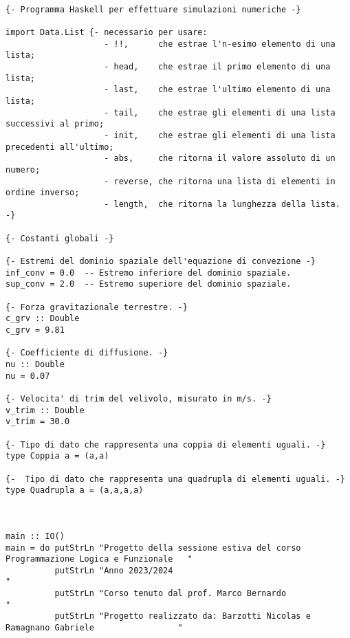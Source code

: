 
\scriptsize
\begin{verbatim}
   
{- Programma Haskell per effettuare simulazioni numeriche -}

import Data.List {- necessario per usare: 
                    - !!,      che estrae l'n-esimo elemento di una lista;
                    - head,    che estrae il primo elemento di una lista;
                    - last,    che estrae l'ultimo elemento di una lista; 
                    - tail,    che estrae gli elementi di una lista successivi al primo;
                    - init,    che estrae gli elementi di una lista precedenti all'ultimo;
                    - abs,     che ritorna il valore assoluto di un numero;
                    - reverse, che ritorna una lista di elementi in ordine inverso;
                    - length,  che ritorna la lunghezza della lista. -}

{- Costanti globali -}

{- Estremi del dominio spaziale dell'equazione di convezione -}
inf_conv = 0.0  -- Estremo inferiore del dominio spaziale.
sup_conv = 2.0  -- Estremo superiore del dominio spaziale.

{- Forza gravitazionale terrestre. -}
c_grv :: Double
c_grv = 9.81 

{- Coefficiente di diffusione. -}
nu :: Double
nu = 0.07  

{- Velocita' di trim del velivolo, misurato in m/s. -}
v_trim :: Double
v_trim = 30.0     

{- Tipo di dato che rappresenta una coppia di elementi uguali. -}
type Coppia a = (a,a)

{-  Tipo di dato che rappresenta una quadrupla di elementi uguali. -}
type Quadrupla a = (a,a,a,a)



main :: IO()
main = do putStrLn "Progetto della sessione estiva del corso Programmazione Logica e Funzionale   "
          putStrLn "Anno 2023/2024                                                                "
          putStrLn "Corso tenuto dal prof. Marco Bernardo                                         "
          putStrLn "Progetto realizzato da: Barzotti Nicolas e Ramagnano Gabriele                 "
          

\end{verbatim}
